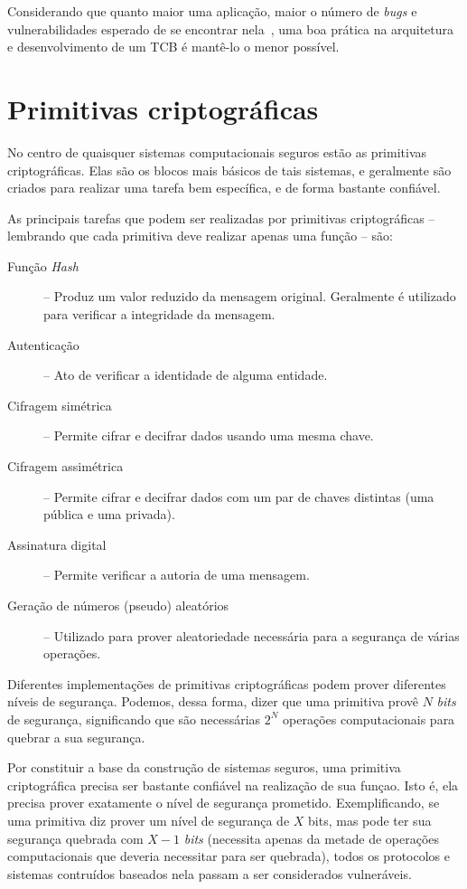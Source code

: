 Considerando que quanto maior uma aplicação, maior o número de \textit{bugs} e
vulnerabilidades esperado de se encontrar nela~\cite{mcconnell2004code}, uma boa
prática na arquitetura e desenvolvimento de um TCB é mantê-lo o menor possível.

\section{Primitivas criptográficas}
\label{sec:estadoarte_primitivas_cripto}

No centro de quaisquer sistemas computacionais seguros estão as primitivas
criptográficas. Elas são os blocos mais básicos de tais sistemas, e geralmente
são criados para realizar uma tarefa bem específica, e de forma bastante
confiável.

As principais tarefas que podem ser realizadas por primitivas criptográficas --
lembrando que cada primitiva deve realizar apenas uma função -- são:
\begin{description}
    \item [Função \textit{Hash}] -- Produz um valor reduzido da mensagem
    original. Geralmente é utilizado para verificar a integridade da mensagem.
    \item [Autenticação] -- Ato de verificar a identidade de alguma entidade.
    \item [Cifragem simétrica] -- Permite cifrar e decifrar dados usando uma
    mesma chave.
    \item [Cifragem assimétrica] -- Permite cifrar e decifrar dados com um par
    de chaves distintas (uma pública e uma privada).
    \item [Assinatura digital] -- Permite verificar a autoria de uma mensagem.
    \item [Geração de números (pseudo) aleatórios] -- Utilizado para prover
    aleatoriedade necessária para a segurança de várias operações.
\end{description}

Diferentes implementações de primitivas criptográficas podem prover diferentes
níveis de segurança. Podemos, dessa forma, dizer que uma primitiva provê $N$
\textit{bits} de segurança, significando que são necessárias $2^N$ operações
computacionais para quebrar a sua segurança.

Por constituir a base da construção de sistemas seguros, uma primitiva
criptográfica precisa ser bastante confiável na realização de sua funçao. Isto
é, ela precisa prover exatamente o nível de segurança prometido. Exemplificando,
se uma primitiva diz prover um nível de segurança de $X$ bits, mas pode ter sua
segurança quebrada com $X-1$ \textit{bits} (necessita apenas da metade de
operações computacionais que deveria necessitar para ser quebrada), todos os
protocolos e sistemas contruídos baseados nela passam a ser considerados
vulneráveis.

